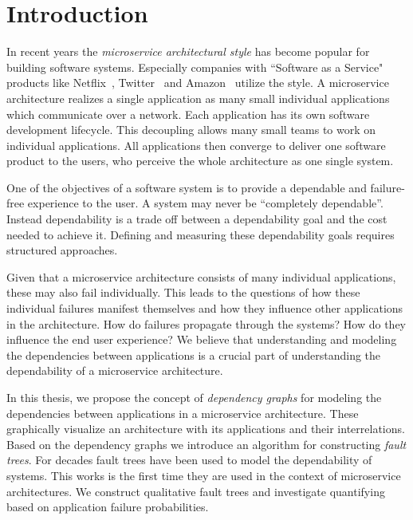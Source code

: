 
\chapter{Introduction}

In recent years the \emph{microservice architectural style} has become popular for building software systems. Especially companies with ``Software as a Service" products like Netflix~\cite{cockcroftqcon2014}, Twitter~\cite{twittersoa} and Amazon~\cite{amazonservices} utilize the style. A microservice architecture realizes a single application as many small individual applications which communicate over a network. Each application has its own software development lifecycle. This decoupling allows many small teams to work on individual applications. All applications then converge to deliver one software product to the users, who perceive the whole architecture as one single system.

One of the objectives of a software system is to provide a dependable and failure-free experience to the user. A system may never be ``completely dependable''. Instead dependability is a trade off between a dependability goal and the cost needed to achieve it. Defining and measuring these dependability goals requires structured approaches.

Given that a microservice architecture consists of many individual applications, these may also fail individually. This leads to the questions of how these individual failures manifest themselves and how they influence other applications in the architecture. How do failures propagate through the systems? How do they influence the end user experience? We believe that understanding and modeling the dependencies between applications is a crucial part of understanding the dependability of a microservice architecture.

In this thesis, we propose the concept of \emph{dependency graphs} for modeling the dependencies between applications in a microservice architecture. These graphically visualize an architecture with its applications and their interrelations. Based on the dependency graphs we introduce an algorithm for constructing \emph{fault trees}. For decades fault trees have been used to model the dependability of systems. This works is the first time they are used in the context of microservice architectures. We construct qualitative fault trees and investigate quantifying based on application failure probabilities.

